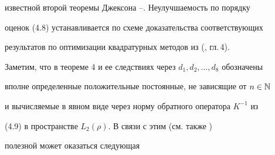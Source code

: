 известной второй теоремы Джексона \cite{13}--\cite{15}. Неулучшаемость по порядку 


оценок (4.8) устанавливается по схеме доказательства соответствующих 


результатов по оптимизации квадратурных методов из  (\cite{3}, гл.\,4).





Заметим, что в теореме 4 и ее следствиях через $d_1,d_2,\dotsc,d_8$ обозначены


вполне определенные положительные постоянные, не зависящие от $n\in \Bbb{N}$


и вычисляемые в явном виде через норму обратного оператора $K^{-1}$ из 


(4.9) в пространстве $L_2(\rho)$. В связи с этим (см. также \cite{2})


полезной может оказаться следующая








